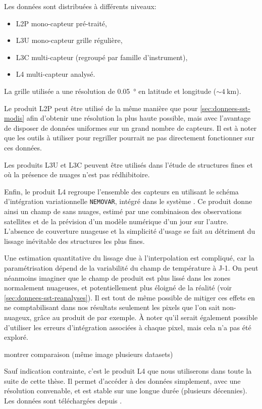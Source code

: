 \documentclass[index]{subfiles}
\begin{document}
Les données sont distribuées à différents niveaux:
\begin{itemize}
  \item L2P mono-capteur pré-traité,
  \item L3U mono-capteur grille régulière,
  \item L3C multi-capteur (regroupé par famille d'instrument),
  \item L4 multi-capteur analysé.
\end{itemize}
La grille utilisée a une résolution de \qty{0.05}{\degree} en latitude et longitude (\(\sim\qty{4}{\km}\)).

Le produit L2P peut être utilisé de la même manière que pour \cref{sec:donnees-sst-modis} afin d'obtenir une résolution la plus haute possible, mais avec l'avantage de disposer de données uniformes sur un grand nombre de capteurs.
Il est à noter que les outils à utiliser pour regriller pourrait ne pas directement fonctionner sur ces données.

Les produits L3U et L3C peuvent être utilisés dans l'étude de structures fines et où la présence de nuages n'est pas rédhibitoire.

Enfin, le produit L4 regroupe l'ensemble des capteurs en utilisant le schéma d'intégration variationnelle \verb|NEMOVAR|, intégré dans le système  \parencite{good_2020}.
Ce produit donne ainsi un champ de  sans nuages, estimé par une combinaison des observations satellites et de la prévision d'un modèle numérique d'un jour sur l'autre.
L'absence de couverture nuageuse et la simplicité d'usage se fait au détriment du lissage inévitable des structures les plus fines.

Une estimation quantitative du lissage due à l'interpolation est compliqué, car la paramétrisation dépend de la variabilité du champ de température à J-1.
On peut néanmoins imaginer que le champ de  produit est plus lissé dans les zones normalement nuageuses, et potentiellement plus éloigné de la réalité (voir \cref{sec:donnees-sst-reanalyses}).
Il est tout de même possible de mitiger ces effets en ne comptabilisant dans nos résultats seulement les pixels que l'on sait non-nuageux, grâce au produit de  par exemple.
À noter qu'il serait également possible d'utiliser les erreurs d'intégration associées à chaque pixel, mais cela n'a pas été exploré.

montrer comparaison (même image plusieurs datasets)

Sauf indication contrainte, c'est le produit L4 que nous utiliserons dans toute la suite de cette thèse.
Il permet d'accéder à des données  simplement, avec une résolution convenable, et est stable sur une longue durée (plusieurs décennies).
Les données sont téléchargées depuis  \parencite{sst_esacci}.
\end{document}
